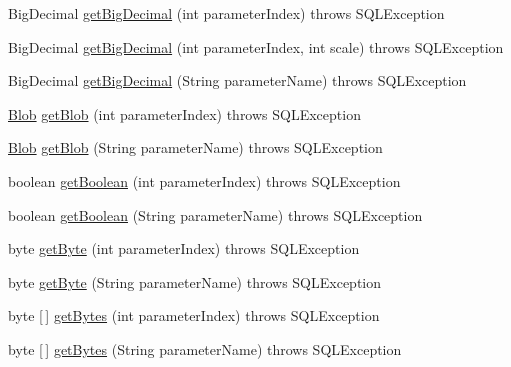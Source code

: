 \begin{DoxyCompactItemize}
\item 
Big\+Decimal \mbox{\hyperlink{classcom_1_1mysql_1_1cj_1_1jdbc_1_1_callable_statement_a1f198827834b03e1db3d18b47c57c654}{get\+Big\+Decimal}} (int parameter\+Index)  throws S\+Q\+L\+Exception 
\item 
Big\+Decimal \mbox{\hyperlink{classcom_1_1mysql_1_1cj_1_1jdbc_1_1_callable_statement_aa8343c70b7c58a64f062ee4d0fef0981}{get\+Big\+Decimal}} (int parameter\+Index, int scale)  throws S\+Q\+L\+Exception 
\item 
Big\+Decimal \mbox{\hyperlink{classcom_1_1mysql_1_1cj_1_1jdbc_1_1_callable_statement_adc05152dc0cfb8a4dfc6a9d4c6ea989e}{get\+Big\+Decimal}} (String parameter\+Name)  throws S\+Q\+L\+Exception 
\item 
\mbox{\hyperlink{classcom_1_1mysql_1_1cj_1_1jdbc_1_1_blob}{Blob}} \mbox{\hyperlink{classcom_1_1mysql_1_1cj_1_1jdbc_1_1_callable_statement_a8e4c5f767bd7bd21b27fddd12f787f08}{get\+Blob}} (int parameter\+Index)  throws S\+Q\+L\+Exception 
\item 
\mbox{\hyperlink{classcom_1_1mysql_1_1cj_1_1jdbc_1_1_blob}{Blob}} \mbox{\hyperlink{classcom_1_1mysql_1_1cj_1_1jdbc_1_1_callable_statement_a6901a932f5c35457ae1226f67ce97a3b}{get\+Blob}} (String parameter\+Name)  throws S\+Q\+L\+Exception 
\item 
boolean \mbox{\hyperlink{classcom_1_1mysql_1_1cj_1_1jdbc_1_1_callable_statement_a79e721d38feeff854ff4532cc0ca5aae}{get\+Boolean}} (int parameter\+Index)  throws S\+Q\+L\+Exception 
\item 
boolean \mbox{\hyperlink{classcom_1_1mysql_1_1cj_1_1jdbc_1_1_callable_statement_af41b4f682975fed49bfa17b6b2644bc9}{get\+Boolean}} (String parameter\+Name)  throws S\+Q\+L\+Exception 
\item 
byte \mbox{\hyperlink{classcom_1_1mysql_1_1cj_1_1jdbc_1_1_callable_statement_ae89b7a7ccf06cc8ebbb3039730ebc06f}{get\+Byte}} (int parameter\+Index)  throws S\+Q\+L\+Exception 
\item 
byte \mbox{\hyperlink{classcom_1_1mysql_1_1cj_1_1jdbc_1_1_callable_statement_a8969109951dffa5b6a541fcba87f0c40}{get\+Byte}} (String parameter\+Name)  throws S\+Q\+L\+Exception 
\item 
byte \mbox{[}$\,$\mbox{]} \mbox{\hyperlink{classcom_1_1mysql_1_1cj_1_1jdbc_1_1_callable_statement_a5178d2ef3a082635ffcb28fae3f209de}{get\+Bytes}} (int parameter\+Index)  throws S\+Q\+L\+Exception 
\item 
byte \mbox{[}$\,$\mbox{]} \mbox{\hyperlink{classcom_1_1mysql_1_1cj_1_1jdbc_1_1_callable_statement_a4184f57e3f8e6092f90a93d7feb05af8}{get\+Bytes}} (String parameter\+Name)  throws S\+Q\+L\+Exception 

\end{DoxyCompactItemize}

